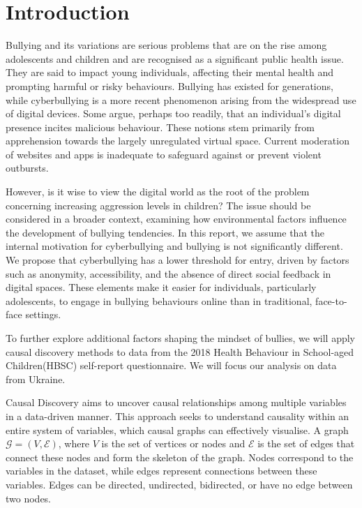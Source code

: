 \documentclass[main.tex]{subfiles}
\begin{document}
\section{Introduction}
Bullying and its variations are serious problems that are on the rise among adolescents and children \cite{Zhu2021} and are recognised as a significant public health issue. They are said to impact young individuals, affecting their mental health and prompting harmful or risky behaviours. Bullying has existed for generations, while cyberbullying is a more recent phenomenon arising from the widespread use of digital devices. Some argue, perhaps too readily, that an individual's digital presence incites malicious behaviour. These notions stem primarily from apprehension towards the largely unregulated virtual space. Current moderation of websites and apps is inadequate to safeguard against or prevent violent outbursts.

However, is it wise to view the digital world as the root of the problem concerning increasing aggression levels in children? The issue should be considered in a broader context, examining how environmental factors influence the development of bullying tendencies. 
In this report, we assume that the internal motivation for cyberbullying and bullying is not significantly different. We propose that cyberbullying has a lower threshold for entry, driven by factors such as anonymity, accessibility, and the absence of direct social feedback in digital spaces. These elements make it easier for individuals, particularly adolescents, to engage in bullying behaviours online than in traditional, face-to-face settings. 

To further explore additional factors shaping the mindset of bullies, we will apply causal discovery methods to data from the 2018 Health Behaviour in School-aged Children(HBSC) self-report questionnaire. We will focus our analysis on data from  Ukraine. 

Causal Discovery aims to uncover causal relationships among multiple variables in a data-driven manner. This approach seeks to understand causality within an entire system of variables, which causal graphs can effectively visualise. A graph \(\mathcal{G} = (V, \mathcal{E})\), where \(V\) is the set of vertices or nodes and \(\mathcal{E}\) is the set of edges that connect these nodes and form the skeleton of the graph. Nodes correspond to the variables in the dataset, while edges represent connections between these variables. Edges can be directed, undirected, bidirected, or have no edge between two nodes.
\end{document}
